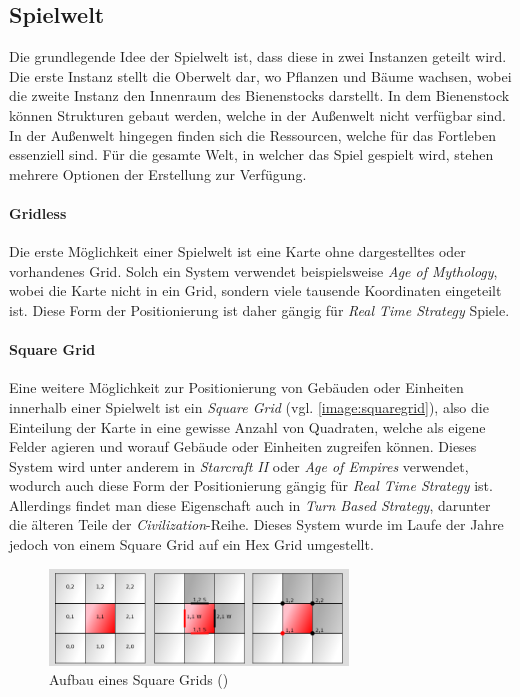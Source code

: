 \subsection{Spielwelt}
Die grundlegende Idee der Spielwelt ist, dass diese in zwei Instanzen geteilt wird. Die erste Instanz stellt die Oberwelt dar, wo Pflanzen und Bäume wachsen, wobei die zweite Instanz den Innenraum des Bienenstocks darstellt. In dem Bienenstock können Strukturen gebaut werden, welche in der Außenwelt nicht verfügbar sind. In der Außenwelt hingegen finden sich die Ressourcen, welche für das Fortleben essenziell sind. Für die gesamte Welt, in welcher das Spiel gespielt wird, stehen mehrere Optionen der Erstellung zur Verfügung.

\paragraph{Gridless}
Die erste Möglichkeit einer Spielwelt ist eine Karte ohne dargestelltes oder vorhandenes Grid. Solch ein System verwendet beispielsweise \textit{Age of Mythology}, wobei die Karte nicht in ein Grid, sondern viele tausende  Koordinaten eingeteilt ist. Diese Form der Positionierung ist daher gängig für \textit{Real Time Strategy} Spiele.

\paragraph{Square Grid}
Eine weitere Möglichkeit zur Positionierung von Gebäuden oder Einheiten innerhalb einer Spielwelt ist ein \textit{Square Grid} (vgl. \autoref{image:squaregrid}), also die Einteilung der Karte in eine gewisse Anzahl von Quadraten, welche als eigene Felder agieren und worauf Gebäude oder Einheiten zugreifen können. Dieses System wird unter anderem in \textit{Starcraft II} oder \textit{Age of Empires} verwendet, wodurch auch diese Form der Positionierung gängig für \textit{Real Time Strategy} ist. Allerdings findet man diese Eigenschaft auch in \textit{Turn Based Strategy}, darunter die älteren Teile der \textit{Civilization}-Reihe. Dieses System wurde im Laufe der Jahre jedoch von einem Square Grid auf ein Hex Grid umgestellt.

\begin{figure}
    \begin{center}
        \includegraphics[width=300px]{0.bilder/squaregrid.png}
    \end{center}
    \caption{Aufbau eines Square Grids (\cite{world:grids})} \label{image:squaregrid}
\end{figure}

